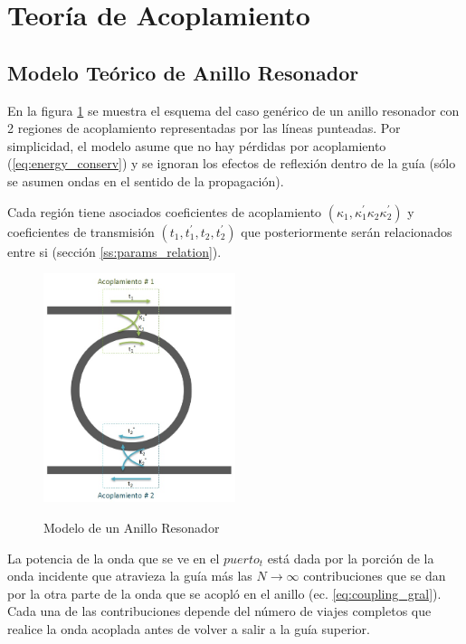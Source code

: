 \section{Teoría de Acoplamiento}
\label{coupling_theory}
\subsection{Modelo Teórico de Anillo Resonador}
En la figura \ref{fig:rr_model} se muestra el esquema del caso genérico de un anillo resonador con 2 regiones de acoplamiento representadas por las líneas punteadas. 
Por simplicidad, el modelo asume que no hay pérdidas por 
acoplamiento (\ref{eq:energy_conserv}) y se ignoran los efectos de reflexión 
dentro de la guía (sólo se asumen ondas en el sentido de la propagación). 

Cada región tiene asociados 
coeficientes de acoplamiento $(\kappa_1,\kappa_1^{'}\kappa_2\kappa_2^{'})$ y
coeficientes de transmisión $(t_1, t_1^{'}, t_2, t_2^{'})$ que posteriormente
serán relacionados entre si (sección \ref{ss:params_relation}).


\begin{figure}[h!]
\caption{Modelo de un Anillo Resonador}
\centering
\includegraphics[width=0.5\textwidth,natwidth=559,natheight=668]{figs/rr_model.jpg}
\label{fig:rr_model}
\end{figure} 


La potencia de la onda que se ve en el $puerto_t$ está dada por la porción de la onda incidente
que atravieza la guía más las $N\to\infty$ contribuciones que se dan por la otra parte de la
onda que se acopló en el anillo (ec. \ref{eq:coupling_gral}). 
Cada una de las contribuciones depende del número de viajes completos que realice la onda
acoplada antes de volver a salir a la guía superior.


